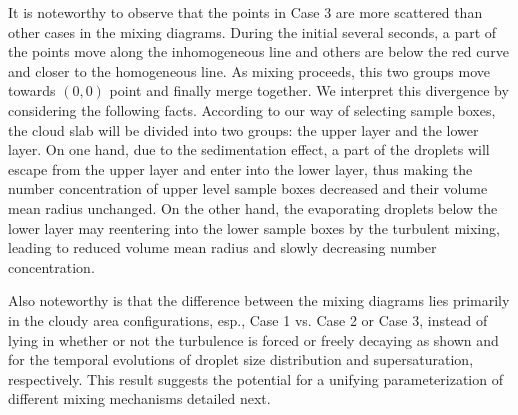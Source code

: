It is noteworthy to observe that the points in Case 3 are more scattered than other cases in the mixing diagrams. During the initial several seconds, a part of the points move along the inhomogeneous line and others are below the red curve and closer to the homogeneous line. As mixing proceeds, this two groups move towards $(0,0)$ point and finally merge together. We interpret this divergence by considering the following facts. According to our way of selecting sample boxes, the cloud slab will be divided into two groups: the upper layer and the lower layer. On one hand, due to the sedimentation effect, a part of the droplets will escape from the upper layer and enter into the lower layer, thus making the number concentration of upper level sample boxes decreased and their volume mean radius unchanged. On the other hand, the evaporating droplets below the lower layer may reentering into the lower sample boxes by the turbulent mixing, leading to reduced volume mean radius and slowly decreasing number concentration. 

Also noteworthy is that the difference between the mixing diagrams lies primarily in the cloudy area configurations, esp., Case 1 vs. Case 2 or Case 3, instead of lying in whether or not the turbulence is forced or freely decaying as shown  and  for the temporal evolutions of droplet size distribution and supersaturation, respectively.  This result suggests the potential for a unifying parameterization of different mixing mechanisms detailed next.

